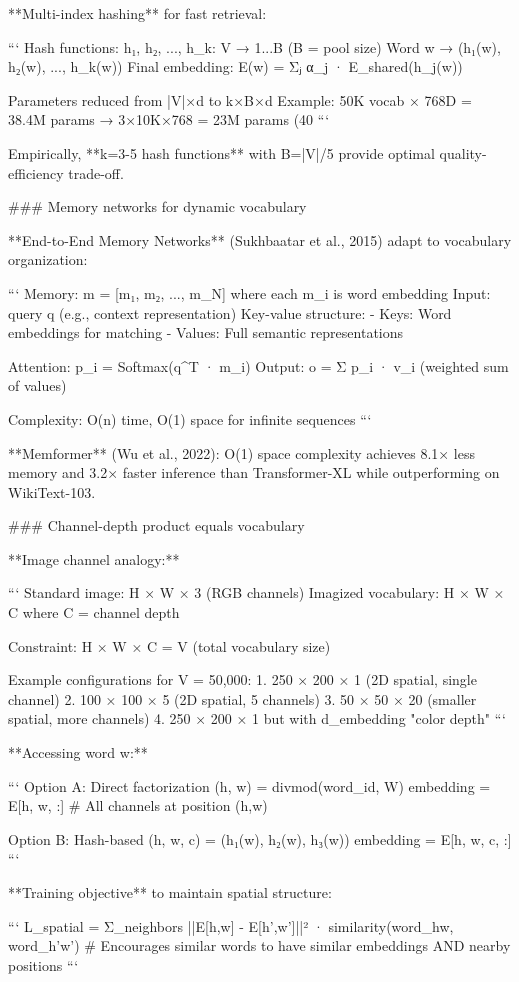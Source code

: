 \documentclass[11pt]{article}
\begin{document}
**Multi-index hashing** for fast retrieval:

```
Hash functions: h₁, h₂, ..., h_k: V → {1...B} (B = pool size)
Word w → (h₁(w), h₂(w), ..., h_k(w))
Final embedding: E(w) = Σⱼ α_j · E_shared(h_j(w))

Parameters reduced from |V|×d to k×B×d
Example: 50K vocab × 768D = 38.4M params → 3×10K×768 = 23M params (40%
```

Empirically, **k=3-5 hash functions** with B=|V|/5 provide optimal quality-efficiency trade-off.

### Memory networks for dynamic vocabulary

**End-to-End Memory Networks** (Sukhbaatar et al., 2015) adapt to vocabulary organization:

```
Memory: m = [m₁, m₂, ..., m_N] where each m_i is word embedding
Input: query q (e.g., context representation)
Key-value structure:
  - Keys: Word embeddings for matching
  - Values: Full semantic representations

Attention: p_i = Softmax(q^T · m_i)
Output: o = Σ p_i · v_i (weighted sum of values)

Complexity: O(n) time, O(1) space for infinite sequences
```

**Memformer** (Wu et al., 2022): O(1) space complexity achieves 8.1× less memory and 3.2× faster inference than Transformer-XL while outperforming on WikiText-103.

### Channel-depth product equals vocabulary

**Image channel analogy:**

```
Standard image: H × W × 3 (RGB channels)
Imagized vocabulary: H × W × C where C = channel depth

Constraint: H × W × C = V (total vocabulary size)

Example configurations for V = 50,000:
1. 250 × 200 × 1 (2D spatial, single channel)
2. 100 × 100 × 5 (2D spatial, 5 channels)
3. 50 × 50 × 20 (smaller spatial, more channels)
4. 250 × 200 × 1 but with d_embedding "color depth"
```

**Accessing word w:**

```
Option A: Direct factorization
(h, w) = divmod(word_id, W)
embedding = E[h, w, :]  # All channels at position (h,w)

Option B: Hash-based
(h, w, c) = (h₁(w), h₂(w), h₃(w))
embedding = E[h, w, c, :]
```

**Training objective** to maintain spatial structure:

```
L_spatial = Σ_neighbors ||E[h,w] - E[h',w']||² · similarity(word_hw, word_h'w')
# Encourages similar words to have similar embeddings AND nearby positions
```
\end{document}
